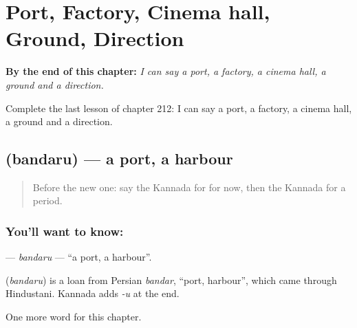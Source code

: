 
\chapter{Port, Factory, Cinema hall, Ground, Direction}
\label{ch:ka-port-factory-cinema-hall-ground-direction}

\begin{chapteropening}
\textbf{By the end of this chapter:} \emph{I can say a port, a factory, a cinema hall, a ground and a direction.}

Complete the last lesson of chapter 212: I can say a port, a factory, a cinema hall, a ground and a direction.
\end{chapteropening}

\section[\texorpdfstring{\kn{ಬಂದರು} (bandaru)}{ಬಂದರು (bandaru)}]{ (bandaru) — a port, a harbour}

\label{lesson:KA-C212-bandaru}



\begin{quote}
Before the new one: say the Kannada for for now, then the Kannada for a period.
\end{quote}

\subsection*{You'll want to know: }
\textbf{} — \emph{bandaru} — \textquotedblleft{}a port, a harbour\textquotedblright{}.

\begin{cousinweb}
\textbf{} (\emph{bandaru}) is a loan from Persian \emph{bandar}, \textquotedblleft{}port, harbour\textquotedblright{}, which came through Hindustani. Kannada adds \emph{-u} at the end.
\end{cousinweb}

\begin{grammarlens}[title={What you've built}]
One more word for this chapter.
\end{grammarlens}

